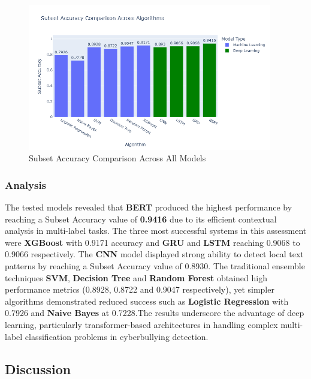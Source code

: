 \documentclass[pdflatex,sn-mathphys-num]{sn-jnl}%
\theoremstyle{thmstyleone}%
\theoremstyle{thmstyletwo}%
\theoremstyle{thmstylethree}%
\begin{document}
\begin{figure}[H]
    \centering
    \includegraphics[width=0.95\textwidth]{Graphs/Subset Accuracy Comparison Across Algorithms.png}
    \caption{Subset Accuracy Comparison Across All Models}
    \label{fig:subset_accuracy_final}
\end{figure}


\subsubsection{Analysis}

The tested models revealed that \textbf{BERT} produced the highest performance by reaching a Subset Accuracy value of \textbf{0.9416} due to its efficient contextual analysis in multi-label tasks. The three most successful systems in this assessment were \textbf{XGBoost} with 0.9171 accuracy and \textbf{GRU} and \textbf{LSTM} reaching 0.9068 to 0.9066 respectively.
The \textbf{CNN} model displayed strong ability to detect local text patterns by reaching a Subset Accuracy value of 0.8930. The traditional ensemble techniques \textbf{SVM}, \textbf{Decision Tree} and \textbf{Random Forest} obtained high performance metrics (0.8928, 0.8722 and 0.9047 respectively), yet simpler algorithms demonstrated reduced success such as \textbf{Logistic Regression} with 0.7926 and \textbf{Naive Bayes} at 0.7228.The results underscore the advantage of deep learning, particularly transformer-based architectures in handling complex multi-label classification problems in cyberbullying detection.


\subsection{Discussion}
\end{document}
